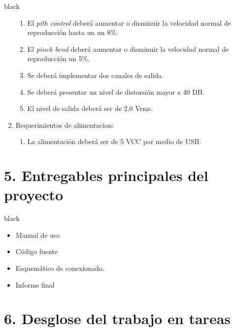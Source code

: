 \documentclass[11pt]{charter}
\begin{document}
\begin{consigna}{black}
\begin{enumerate}
\begin{enumerate}
	\item El \textit{pith control} deberá aumentar o disminuir la velocidad normal de reproducción hasta un un 8\%.
	\item El \textit{pinch bend} deberá aumentar o disminuir la velocidad normal de reproducción un 5\%.
	\item Se deberá implementar dos canales de salida.
	\item Se deberá presentar un nivel de distorsión mayor a 40 DB.
	\item El nivel de salida deberá ser de 2,0 Vrms.
	\end{enumerate}
\item Requerimientos de alimentacion:
	\begin{enumerate}
	\item La alimentación deberá ser de 5 VCC por medio de USB.
	\end{enumerate}
\end{enumerate}
\end{consigna}

\section{5. Entregables principales del proyecto}
\label{sec:entregables}

\begin{consigna}{black}
\begin{itemize}
\item Manual de uso
\item Código fuente
\item Esquemático de conexionado.
\item Informe final

\end{itemize}

\end{consigna}

\section{6. Desglose del trabajo en tareas}
\label{sec:wbs}
\end{document}

